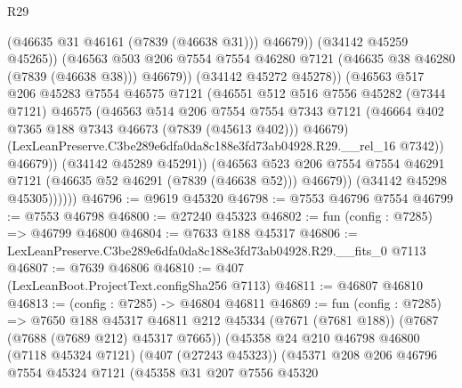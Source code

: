 \begin{lexlean}{R29}
\begin{coremodule}
                              (@46635 @31 @46161 (@7839 (@46638 @31)))
                              @46679))
                          (@34142 @45259 @45265))
                        (@46563
                          @503
                          @206
                          @7554
                          @7554
                          @46280
                          @7121
                          (@46635 @38 @46280 (@7839 (@46638 @38)))
                          @46679))
                      (@34142 @45272 @45278))
                    (@46563
                      @517
                      @206
                      @45283
                      @7554
                      @46575
                      @7121
                      (@46551
                        @512
                        @516
                        @7556
                        @45282
                        (@7344 @7121)
                        @46575
                        (@46563
                          @514
                          @206
                          @7554
                          @7554
                          @7343
                          @7121
                          (@46664 @402 @7365 @188 @7343 @46673 (@7839 (@45613 @402)))
                          @46679)
                        (LexLeanPreserve.C3be289e6dfa0da8c188e3fd73ab04928.R29.__rel_16 @7342))
                      @46679))
                  (@34142 @45289 @45291))
                (@46563
                  @523
                  @206
                  @7554
                  @7554
                  @46291
                  @7121
                  (@46635 @52 @46291 (@7839 (@46638 @52)))
                  @46679))
              (@34142 @45298 @45305))))))
@46796 := @9619 @45320
@46798 := @7553 @46796 @7554
@46799 := @7553 @46798
@46800 := @27240 @45323
@46802 := fun (config : @7285) => @46799 @46800
@46804 := @7633 @188 @45317
@46806 := LexLeanPreserve.C3be289e6dfa0da8c188e3fd73ab04928.R29.__fits_0 @7113
@46807 := @7639 @46806
@46810 := @407 (LexLeanBoot.ProjectText.configSha256 @7113)
@46811 := @46807 @46810
@46813 := (config : @7285) -> @46804 @46811
@46869 := fun (config : @7285) =>
  @7650
    @188
    @45317
    @46811
    @212
    @45334
    (@7671 (@7681 @188))
    (@7687 (@7688 (@7689 @212) @45317 @7665))
    (@45358
      @24
      @210
      @46798
      @46800
      (@7118 @45324 @7121)
      (@407 (@27243 @45323))
      (@45371
        @208
        @206
        @46796
        @7554
        @45324
        @7121
        (@45358
          @31
          @207
          @7556
          @45320

\end{coremodule}
\end{lexlean}
